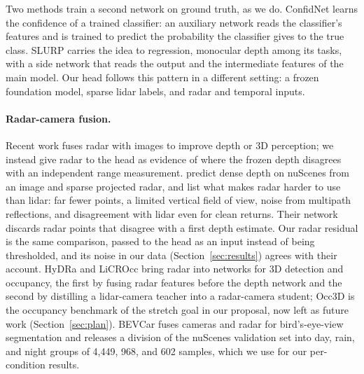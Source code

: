 Two methods train a second network on ground truth, as we do. ConfidNet \citep{corbiere2019confidnet} learns the confidence of a trained classifier: an auxiliary network reads the classifier's features and is trained to predict the probability the classifier gives to the true class. SLURP \citep{yu2021slurp} carries the idea to regression, monocular depth among its tasks, with a side network that reads the output and the intermediate features of the main model. Our head follows this pattern in a different setting: a frozen foundation model, sparse lidar labels, and radar and temporal inputs.

\paragraph{Radar-camera fusion.}
Recent work fuses radar with images to improve depth or 3D perception; we instead give radar to the head as evidence of where the frozen depth disagrees with an independent range measurement. \citet{lin2020radardepth} predict dense depth on nuScenes from an image and sparse projected radar, and list what makes radar harder to use than lidar: far fewer points, a limited vertical field of view, noise from multipath reflections, and disagreement with lidar even for clean returns. Their network discards radar points that disagree with a first depth estimate. Our radar residual is the same comparison, passed to the head as an input instead of being thresholded, and its noise in our data (Section~\ref{sec:results}) agrees with their account. HyDRa \citep{wolters2025hydra} and LiCROcc \citep{ma2024licrocc} bring radar into networks for 3D detection and occupancy, the first by fusing radar features before the depth network and the second by distilling a lidar-camera teacher into a radar-camera student; Occ3D \citep{tian2023occ3d} is the occupancy benchmark of the stretch goal in our proposal, now left as future work (Section~\ref{sec:plan}). BEVCar \citep{schramm2024bevcar} fuses cameras and radar for bird's-eye-view segmentation and releases a division of the nuScenes validation set into day, rain, and night groups of 4,449, 968, and 602 samples, which we use for our per-condition results.

